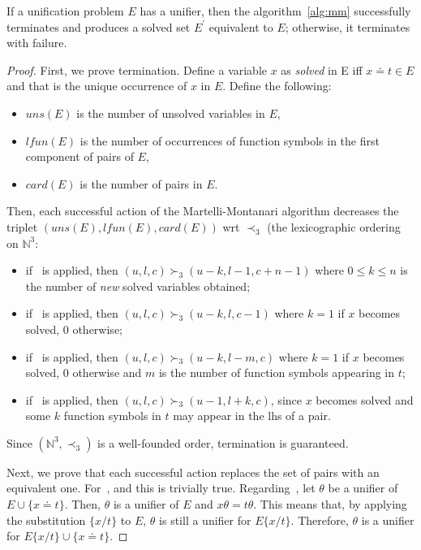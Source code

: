 \begin{thm}
    If a unification problem \(E\) has a unifier, then the algorithm~\ref{alg:mm} successfully terminates and produces a solved set \(E^\prime\) equivalent to \(E\); otherwise, it terminates with failure.
\end{thm}
\begin{proof}
    First, we prove termination.
    Define a variable \(x\) as \emph{solved} in E iff \(x \doteq t \in E\) and that is the unique occurrence of \(x\) in \(E\).
    Define the following:
    \begin{itemize}
        \item \(uns(E)\) is the number of unsolved variables in \(E\),
        \item \(lfun(E)\) is the number of occurrences of function symbols in the first component of pairs of \(E\),
        \item \(card(E)\) is the number of pairs in \(E\).
    \end{itemize}
    Then, each successful action of the Martelli-Montanari algorithm decreases the triplet \((uns(E),lfun(E),card(E))\) wrt \(\prec_3\) (the lexicographic ordering on \(\mathbb{N}^3\):
    \begin{itemize}
        \item if~ is applied, then \((u,l,c) \succ_3 (u - k, l - 1, c + n - 1)\) where \(0 \le k \le n\) is the number of \emph{new} solved variables obtained;
        \item if~ is applied, then \((u,l,c) \succ_3 (u - k, l, c - 1)\) where \(k = 1\) if \(x\) becomes solved, \(0\) otherwise;
        \item if~ is applied, then \((u,l,c) \succ_3 (u - k, l - m, c)\) where \(k = 1\) if \(x\) becomes solved, \(0\) otherwise and \(m\) is the number of function symbols appearing in \(t\);
        \item if~ is applied, then \((u,l,c) \succ_3 (u - 1, l + k, c)\), since \(x\) becomes solved and some \(k\) function symbols in \(t\) may appear in the lhs of a pair.
    \end{itemize}
    Since \((\mathbb{N}^3,\prec_3)\) is a well-founded order, termination is guaranteed.

    Next, we prove that each successful action replaces the set of pairs with an equivalent one. For~,  and  this is trivially true.
    Regarding~, let \(\theta\) be a unifier of \(E \cup \lbrace x \doteq t \rbrace\). Then, \(\theta\) is a unifier of \(E\) and \(x\theta = t\theta\).
    This means that, by applying the substitution \(\lbrace x/t \rbrace\) to \(E\), \(\theta\) is still a unifier for \(E\lbrace x/t \rbrace\).
    Therefore, \(\theta\) is a unifier for \(E\lbrace x/t \rbrace \cup \lbrace x \doteq t \rbrace\).


\end{proof}
